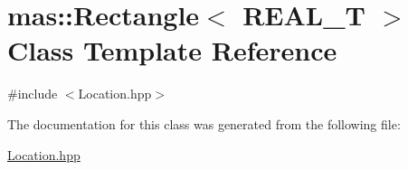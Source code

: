 \hypertarget{classmas_1_1_rectangle}{}\section{mas\+:\+:Rectangle$<$ R\+E\+A\+L\+\_\+\+T $>$ Class Template Reference}
\label{classmas_1_1_rectangle}


{\ttfamily \#include $<$Location.\+hpp$>$}



The documentation for this class was generated from the following file\+:\begin{DoxyCompactItemize}
\item 
\hyperlink{_location_8hpp}{Location.\+hpp}\end{DoxyCompactItemize}
